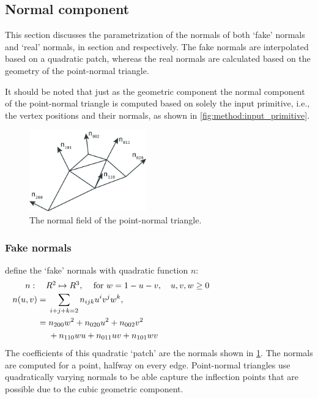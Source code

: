 
\subsection{Normal component}\label{ss:normal_component}
This section discusses the parametrization of the normals of both `fake' normals and `real' normals, in section  and  respectively. The fake normals are interpolated based on a quadratic patch, whereas the real normals are calculated based on the geometry of the point-normal triangle. 

It should be noted that just as the geometric component the normal component of the point-normal triangle is computed based on solely the input primitive, i.e., the vertex positions and their normals, as shown in \cref{fig:method:input_primitive}. 

\begin{figure}
	\centering
	\includegraphics[width=0.45\textwidth]{./content/img/method/normals.png}
	\caption{The normal field of the point-normal triangle.}
	\label{fig:method:normal_field}
\end{figure}

\subsubsection{Fake normals}
\label{sss:method:normals:fakeNormals}
	\citeauthor{vlachos2001curved} define the `fake' normals with quadratic function $n$:
	\begin{align}
	\noalign{$n: \quad R^2 \mapsto R^3,\quad$ for $w = 1 - u - v, \quad u, v, w \geq 0$}
	\begin{split}\label{eq:method:quadratic_normal_patch}
	    n(u,v) ={}& \sum_{i + j + k = 2} n_{ijk}u^i v^j w^k,\\
	      	   ={}& n_{200}w^2 + n_{020}u^2 + n_{002}v^2\\
	      	    {}& + n_{110}wu + n_{011}uv + n_{101}wv\\
	\end{split}
	\end{align}
	The coefficients of this quadratic `patch' are the normals shown in \cref{fig:method:normal_field}. The normals are computed for a point, halfway on every edge. Point-normal triangles use quadratically varying normals to be able capture the inflection points that are possible due to the cubic geometric component. 

